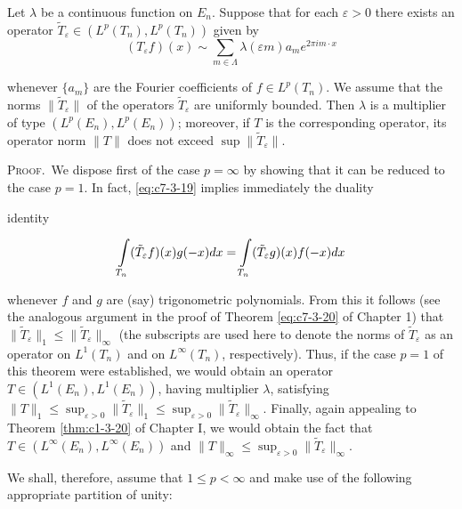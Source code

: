 \begin{theorem}
\label{thm:c7-3-18}
Let $\lambda$ be a continuous function on $E_n$. Suppose that for each $\varepsilon > 0$ there exists an operator $\tilde{T}_\varepsilon \in (L^p(T_n), L^p(T_n))$ given by
\begin{equation}\label{eq:c7-3-19}
(T_{\varepsilon}f)(x)\sim\sum_{m\in\Lambda}\lambda(\varepsilon m)a_{m}e^{2\pi i m\cdot x}
\end{equation}

whenever $\{a_m\}$ are the Fourier coefficients of $f \in L^p(T_n)$. We assume that the norms $\|\tilde{T}_\varepsilon\|$ of the operators $\tilde{T}_\varepsilon$ are uniformly bounded. Then $\lambda$ is a multiplier of type $(L^p(E_n), L^p(E_n))$; moreover, if $T$ is the corresponding operator, its operator norm $\|T\|$ does not exceed $\sup \|\tilde{T}_\varepsilon\|$.
\end{theorem}

\textsc{Proof.}\ We dispose first of the case $p = \infty$ by showing that it can be reduced to the case $p = 1$. In fact, \eqref{eq:c7-3-19} implies immediately the duality

identity

\begin{equation}\label{eq:c7-3-20}
\intop_{T_{n}}(\tilde{T}_{\varepsilon}f)(x)g(-x)d x=\intop_{T_{n}}(\tilde{T}_{\varepsilon}g)(x)f(-x)d x
\end{equation}

whenever $f$ and $g$ are (say) trigonometric polynomials. From this it follows (see the analogous argument in the proof of Theorem \ref{eq:c7-3-20} of Chapter 1) that $\|\widetilde{T}_{\varepsilon}\|_{1} \leq \|\widetilde{T}_{\varepsilon}\|_{\infty}$ (the subscripts are used here to denote the norms of $\widetilde{T}_{\varepsilon}$ as an operator on $L^{1}(T_{n})$ and on $L^{\infty}(T_{n})$, respectively). Thus, if the case $p=1$ of this theorem were established, we would obtain an operator $T \in (L^{1}(E_{n}), L^{1}(E_{n}))$, having multiplier $\lambda$, satisfying $\|T\|_{1} \leq \sup_{\varepsilon > 0} \|\widetilde{T}_{\varepsilon}\|_{1} \leq \sup_{\varepsilon > 0} \|\widetilde{T}_{\varepsilon}\|_{\infty}$. Finally, again appealing to Theorem \ref{thm:c1-3-20} of Chapter I, we would obtain the fact that $T \in (L^{\infty}(E_{n}), L^{\infty}(E_{n}))$ and $\|T\|_{\infty} \leq \sup_{\varepsilon > 0} \|\widetilde{T}_{\varepsilon}\|_{\infty}$.

We shall, therefore, assume that $1 \leq p < \infty$ and make use of the following appropriate partition of unity:

